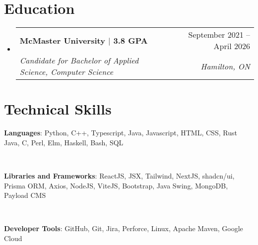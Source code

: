 \documentclass[letterpaper,11pt]{article}
\makeatletter
\newcommand{\resumeSubheading}[4]{
  \vspace{-2pt}\item
    \begin{tabular*}{0.97\textwidth}[t]{l@{\extracolsep{\fill}}r}
      \textbf{#1} & #2 \\
      \textit{\small#3} & \textit{\small #4} \\
    \end{tabular*}\vspace{-7pt}
}
\newcommand{\resumeDatedList}[2]{
    \vspace{-2pt}\item
    \begin{tabular*}{0.97\textwidth}[t]{l@{\extracolsep{\fill}}r}
        #1 & #2 \\
    \end{tabular*}
}
\newcommand{\resumeListItem}[1]{
    \vspace{-2pt}\item#1
}
\newcommand{\resumeSubHeadingListStart}{\begin{itemize}[leftmargin=0.15in, label={}]}
\newcommand{\resumeSubHeadingListEnd}{\end{itemize}}
\newcommand{\resumeListStart}{\begin{itemize}[itemindent=-0.33in,leftmargin=0.48in, label={}]}
\newcommand{\resumeListEnd}{\end{itemize}}
\makeatother
\begin{document}
\section{Education}
\resumeSubHeadingListStart
\resumeSubheading
{McMaster University $|$ 3.8 GPA}{September 2021 -- April 2026}
{Candidate for Bachelor of Applied Science, Computer Science}{Hamilton, ON}
\resumeSubHeadingListEnd

%
\section{Technical Skills}
\resumeListStart\small{
	\resumeListItem{\textbf{Languages}:
		Python, C++, Typescript, Java, Javascript, HTML, CSS, Rust Java, C, Perl, Elm, Haskell, Bash, SQL
	} \\
	\resumeListItem{\textbf{Libraries and Frameworks}:
		ReactJS, JSX, Tailwind, NextJS, shadcn/ui, Prisma ORM, Axios, NodeJS, ViteJS, Bootstrap, Java Swing, MongoDB, Payload CMS
	} \\
	\resumeListItem{\textbf{Developer Tools}:
		GitHub, Git, Jira, Perforce, Linux, Apache Maven, Google Cloud
	} \\
} \resumeListEnd


%

\end{document}
